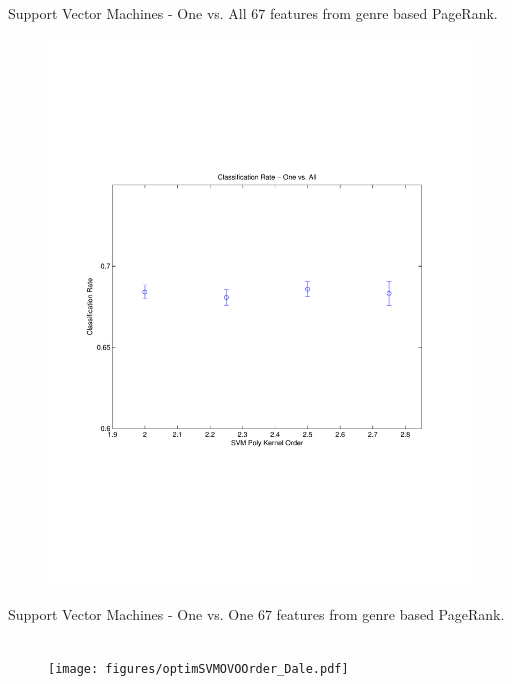 \documentclass[xcolor=dvipsnames,t]{beamer} %
\begin{document}
\begin{frame}{Support Vector Machines - One vs. All}
   $67$ features from genre based PageRank.
   ~\\[-9em]
   \begin{figure}
      \centering
      \includegraphics[width=\textwidth]{figures/optimSVMOVAOrder_Dale.pdf}
   \end{figure}
\end{frame}

\begin{frame}{Support Vector Machines - One vs. One}
   $67$ features from genre based PageRank.
   ~\\[-9em]
   \begin{figure}
      \centering
      \texttt{[image: figures/optimSVMOVOOrder\_Dale.pdf]}
   \end{figure}
\end{frame}
\end{document}
